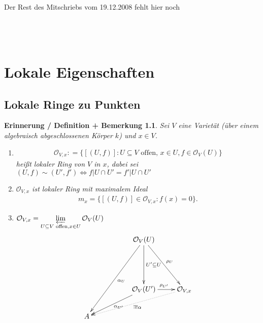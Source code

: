 \documentclass[a4paper,12pt]{report}
\theoremstyle{break}
\newtheorem{ErinnDefBem}[Def]{Erinnerung / Definition + Bemerkung}
\theoremstyle{nonumberbreak}
\theoremstyle{nonumberplain}
\newcommand{\defeqr}[0]{\mathrel{\mathop:}=}
\newcommand{\ilim}{\mathop{\varprojlim}\limits}
\begin{document}
\\
\\
\\
\\
\Large{Der Rest des Mitschriebs vom 19.12.2008 fehlt hier noch}
\\
\\
\\
\\

\chapter{Lokale Eigenschaften}
\setcounter{section}{13}
\section{Lokale Ringe zu Punkten}
\begin{ErinnDefBem}
  \label{bem:14.1}
  Sei $V$ eine Varietät (über einem algebraisch abgeschlossenen Körper $k$) und $x\in V$.
  \begin{enumerate}
  \item
    \begin{align*}
      \mathcal{O}_{V,x}\defeqr\{[(U,f)]:U\subseteq V \text{ offen, } x\in U, f\in\mathcal{O}_V(U)\}
    \end{align*}
    heißt lokaler Ring von $V$ in $x$, dabei sei $(U,f)\sim (U',f')\Leftrightarrow f\vert U\cap U'=f'\vert U\cap U'$
  \item $\mathcal{O}_{V,x}$ ist lokaler Ring mit maximalem Ideal
    \begin{align*}
      m_x=\{[(U,f)]\in\mathcal{O}_{V,x}:f(x)=0\}.
    \end{align*}
  \item $\mathcal{O}_{V,x}=\ilim_{U\subseteq V \text{ offen},x\in U}\mathcal{O}_V(U)$ \\
    \begin{align*}
    \begin{xy}
      \xymatrix{
        & & \mathcal{O}_V(U)\ar[3,-2]^{\alpha_U}\ar[2,1]^{\rho_U}\ar[2,0]^{U'\subseteq U} & \\
        & & & \\
        & & \mathcal{O}_V(U')\ar[r]^{\rho_{U'}}\ar[1,-2]^{\alpha_{U'}} & \mathcal{O}_{V,x}\ar@{.>}[1,-3]^{\exists! \alpha} \\
        A & & & \\
      }
    \end{xy}
    \end{align*}
  \end{enumerate}
\end{ErinnDefBem}
\end{document}
